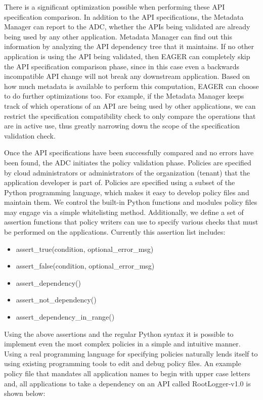There is a significant optimization possible when performing these API specification comparison. In addition to the API specifications,
the Metadata Manager can report to the ADC, whether the APIs being validated are already being used by any other application. Metadata Manager
can find out this information by analyzing the API dependency tree that it maintains. If no other application is using the API being validated, then EAGER
can completely skip the API specification comparison phase, since in this case even a backwards incompatible API change will not break any 
downstream application. 
Based on how much metadata is available to perform this computation, EAGER can choose to do further optimizations too. For example, if
the Metadata Manager keeps track of which operations of an API are being used by other applications, we can restrict the specification compatibility
check to only compare the operations that are in active use, thus greatly narrowing down the scope of the specification validation check.

Once the API specifications have been successfully compared and no errors have been found, the ADC initiates the policy validation phase. Policies
are specified by cloud administrators or administrators of the organization (tenant) that the application developer is part of. Policies are specified using
a subset of the Python programming language, which makes it easy to develop policy files and maintain them. We control the built-in Python functions and
modules policy files may engage via a simple whitelisting method. Additionally, we define a set of assertion functions that policy writers can use to specify
various checks that must be performed on the applications. Currently this assertion list includes:

\begin{itemize}
\item assert\_true(condition, optional\_error\_msg)
\item assert\_false(condition, optional\_error\_msg)
\item assert\_dependency()
\item assert\_not\_dependency()
\item assert\_dependency\_in\_range()
\end{itemize}

Using the above assertions and the regular Python syntax it is possible to implement even the most complex policies in a simple and intuitive manner.
Using a real programming language for specifying policies naturally lends itself to using existing programming tools to edit and debug policy files. An example
policy file that mandates all application names to begin with upper case letters and, all applications to take a dependency on an API called RootLogger-v1.0
is shown below:

